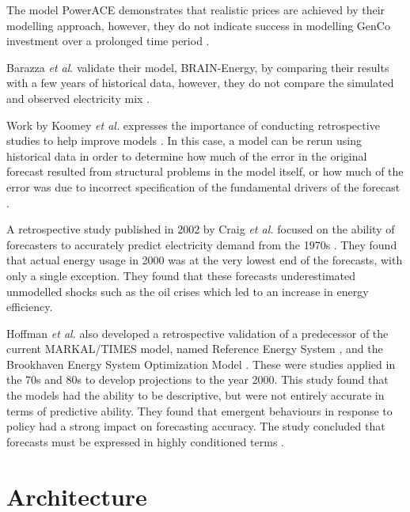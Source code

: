 The model PowerACE demonstrates that realistic prices are achieved by their modelling approach, however, they do not indicate success in modelling GenCo investment over a prolonged time period \cite{Ringler2012}.

Barazza \textit{et al}. validate their model, BRAIN-Energy, by comparing their results with a few years of historical data, however, they do not compare the simulated and observed electricity mix \cite{Barazza2020}.

Work by Koomey \textit{et al.} expresses the importance of conducting retrospective studies to help improve models \cite{Koomey2003}. In this case, a model can be rerun using historical data in order to determine how much of the error in the original forecast resulted from structural problems in the model itself, or how much of the error was due to incorrect specification of the fundamental drivers of the forecast \cite{Koomey2003}.

A retrospective study published in 2002 by Craig \textit{et al.} focused on the ability of forecasters to accurately predict electricity demand from the 1970s \cite{Craig2002}. They found that actual energy usage in 2000 was at the very lowest end of the forecasts, with only a single exception. They found that these forecasts underestimated unmodelled shocks such as the oil crises which led to an increase in energy efficiency.

Hoffman \textit{et al.} also developed a retrospective validation of a predecessor of the current MARKAL\slash TIMES model, named Reference Energy System \cite{Hoffman_1973}, and the Brookhaven Energy System Optimization Model \cite{ERDA_48}. These were studies applied in the 70s and 80s to develop projections to the year 2000. This study found that the models had the ability to be descriptive, but were not entirely accurate in terms of predictive ability. They found that emergent behaviours in response to policy had a strong impact on forecasting accuracy. The study concluded that forecasts must be expressed in highly conditioned terms \cite{Hoffman2011}. 





















\section{Architecture}

